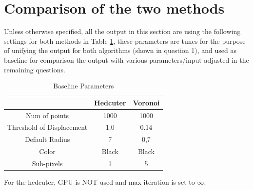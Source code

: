 \documentclass[11pt]{article}
\begin{document}
\begin{enumerate}
\end{enumerate}

\section{Comparison of the two methods}
Unless otherwise specified, all the output in this section are using the following settings for both methods in Table \ref{tb:param}, these parameters are tunes for the purpose of unifying the output for both algorithms (shown in question 1), and used as baseline for comparison the output with various parameters/input adjusted in the remaining questions.
\begin{table}[H]
\centering
\caption{Baseline Parameters }
\label{tb:param}
\begin{tabular}{|c|c|c|}
\hline 
 & Hedcuter & Voronoi \\ 
\hline 
Num of points & 1000 & 1000 \\ 
\hline 
Threshold of Displacement& 1.0 & 0.14\\ 
 \hline 
Default Radius & 7 & 0,7 \\ 
\hline 
Color & Black & Black \\ 
\hline 
Sub-pixels & 1 & 5 \\ 
\hline 
\end{tabular} 
\end{table}
For the hedcuter, GPU is NOT used and max iteration is set to $\infty$.
\end{document}
